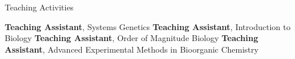 \begin{rubric}{Teaching Activities}

\entry*[2017--2018]%
	\textbf{Teaching Assistant}, Systems Genetics
\entry*[2016]
	\textbf{Teaching Assistant}, Introduction to Biology
\entry*[2015]
	\textbf{Teaching Assistant}, Order of Magnitude Biology
\entry*[2014]
	\textbf{Teaching Assistant}, Advanced Experimental Methods in Bioorganic
	Chemistry
%
\end{rubric}
